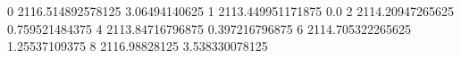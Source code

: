 0 2116.514892578125 3.06494140625
1 2113.449951171875 0.0
2 2114.20947265625 0.759521484375
4 2113.84716796875 0.397216796875
6 2114.705322265625 1.25537109375
8 2116.98828125 3.538330078125
